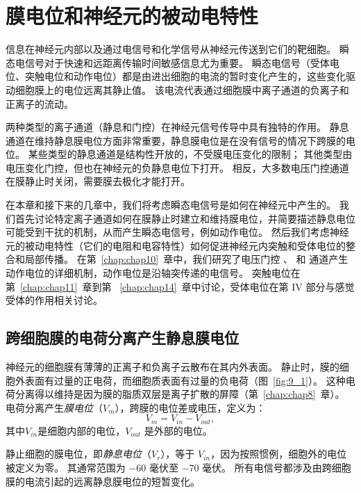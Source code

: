 \chapter{膜电位和神经元的被动电特性} \label{chap:chap9}

信息在神经元内部以及通过电信号和化学信号从神经元传送到它们的靶细胞。
瞬态电信号对于快速和远距离传输时间敏感信息尤为重要。
瞬态电信号（受体电位、突触电位和动作电位）都是由进出细胞的电流的暂时变化产生的，这些变化驱动细胞膜上的电位远离其静止值。
该电流代表通过细胞膜中离子通道的负离子和正离子的流动。


两种类型的离子通道（静息和门控）在神经元信号传导中具有独特的作用。
静息通道在维持静息膜电位方面非常重要，静息膜电位是在没有信号的情况下跨膜的电位。
某些类型的静息通道是结构性开放的，不受膜电压变化的限制；
其他类型由电压变化门控，但也在神经元的负静息电位下打开。
相反，大多数电压门控通道在膜静止时关闭，需要膜去极化才能打开。


在本章和接下来的几章中，我们将考虑瞬态电信号是如何在神经元中产生的。
我们首先讨论特定离子通道如何在膜静止时建立和维持膜电位，并简要描述静息电位可能受到干扰的机制，从而产生瞬态电信号，例如动作电位。
然后我们考虑神经元的被动电特性（它们的电阻和电容特性）如何促进神经元内突触和受体电位的整合和局部传播。
在第~\ref{chap:chap10}~章中，我们研究了电压门控 、 和  通道产生动作电位的详细机制，动作电位是沿轴突传递的电信号。
突触电位在第~\ref{chap:chap11}~章到第 ~\ref{chap:chap14}~章中讨论，受体电位在第 IV 部分与感觉受体的作用相关讨论。



\section{跨细胞膜的电荷分离产生静息膜电位}

神经元的细胞膜有薄薄的正离子和负离子云散布在其内外表面。
静止时，膜的细胞外表面有过量的正电荷，而细胞质表面有过量的负电荷（图~\ref{fig:9_1}）。
这种电荷分离得以维持是因为膜的脂质双层是离子扩散的屏障（第~\ref{chap:chap8}~章）。
电荷分离产生\textit{膜电位}（$ V_m $），跨膜的电位差或电压，定义为：
\begin{equation}
	V_m = V_{in} - V_{out},
\end{equation}
其中$ V_{in} $是细胞内部的电位，$ V_{out} $ 是外部的电位。


静止细胞的膜电位，即\textit{静息电位}（$ V_r $），等于 $V_{in}$，因为按照惯例，细胞外的电位被定义为零。
其通常范围为 −60 毫伏至 −70 毫伏。
所有电信号都涉及由跨细胞膜的电流引起的远离静息膜电位的短暂变化。


